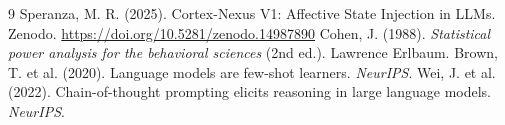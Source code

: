 \documentclass[12pt, a4paper]{article}
\begin{document}

\begin{thebibliography}{9}
 Speranza, M. R. (2025). Cortex-Nexus V1: Affective State Injection in LLMs. Zenodo. \url{https://doi.org/10.5281/zenodo.14987890}
 Cohen, J. (1988). \textit{Statistical power analysis for the behavioral sciences} (2nd ed.). Lawrence Erlbaum.
 Brown, T. et al. (2020). Language models are few-shot learners. \textit{NeurIPS}.
 Wei, J. et al. (2022). Chain-of-thought prompting elicits reasoning in large language models. \textit{NeurIPS}.
\end{thebibliography}
\end{document}
